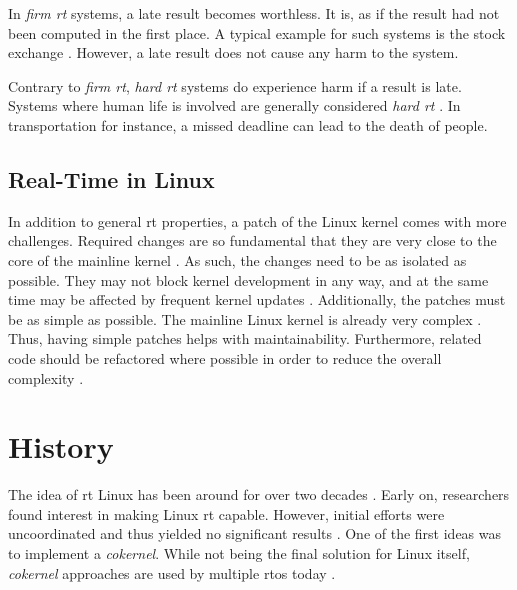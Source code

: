 \documentclass[10pt,twocolumn,a4paper]{article}
\begin{document}
In \emph{firm \acrshort{rt}} systems, a late result becomes worthless.
It is, as if the result had not been computed in the first place.
A typical example for such systems is the stock exchange \cite{reghenzani_realtime_2019}.
However, a late result does not cause any harm to the system.

Contrary to \emph{firm \acrshort{rt}}, \emph{hard \acrshort{rt}} systems do experience harm if a result is late.
Systems where human life is involved are generally considered \emph{hard \acrshort{rt}} \cite{reghenzani_realtime_2019}.
In transportation for instance, a missed deadline can lead to the death of people.

\subsection{Real-Time in Linux}
In addition to general \acrshort{rt} properties, a patch of the Linux kernel comes with more challenges.
Required changes are so fundamental that they are very close to the core of the mainline kernel \cite{perlow_trenches_2021}.
As such, the changes need to be as isolated as possible.
They may not block kernel development in any way, and at the same time may be affected by frequent kernel updates \cite{perlow_trenches_2021}.
Additionally, the patches must be as simple as possible.
The mainline Linux kernel is already very complex \cite{shulyupin_linux_map_2025}.
Thus, having simple patches helps with maintainability.
Furthermore, related code should be refactored where possible in order to reduce the overall complexity \cite{perlow_trenches_2021}.


\section{History}
The idea of \acrshort{rt} Linux has been around for over two decades \cite{casimiro_how_2000}.
Early on, researchers found interest in making Linux \acrshort{rt} capable.
However, initial efforts were uncoordinated and thus yielded no significant results \cite{perlow_trenches_2021}.
One of the first ideas was to implement a \emph{cokernel}.
While not being the final solution for Linux itself, \emph{cokernel} approaches are used by multiple \acrshort{rtos} today \cite{reghenzani_realtime_2019}.
\end{document}
